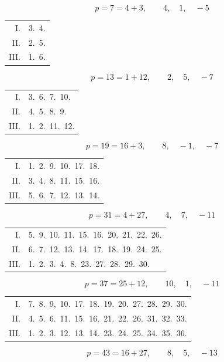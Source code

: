 \clearpage{}
\begin{center}\end{center}


\begingroup\small
\[p = 7 = 4+3, \qquad 4,\quad 1,\quad -5\]
\begin{center}\begin{tabular}{@{}rl@{}}
I. & 3.\ 4.\\
II. & 2.\ 5.\\
III. & 1.\ 6.\end{tabular}\end{center}
\[p = 13 = 1+12, \qquad 2,\quad 5,\quad -7\]
\begin{center}\begin{tabular}{@{}rl@{}}
I. & 3.\ 6.\ 7.\ 10.\\
II. & 4.\ 5.\ 8.\ 9.\\
III. & 1.\ 2.\ 11.\ 12.\end{tabular}\end{center}
\[p = 19 = 16+3, \qquad 8,\quad -1,\quad -7\]
\begin{center}\begin{tabular}{@{}rl@{}}
I. & 1.\ 2.\ 9.\ 10.\ 17.\ 18.\\
II. & 3.\ 4.\ 8.\ 11.\ 15.\ 16.\\
III. & 5.\ 6.\ 7.\ 12.\ 13.\ 14.\end{tabular}\end{center}
\[p = 31 = 4+27, \qquad 4,\quad 7,\quad -11\]
\begin{center}\begin{tabular}{@{}rl@{}}
I. & 5.\ 9.\ 10.\ 11.\ 15.\ 16.\ 20.\ 21.\ 22.\ 26.\\
II. & 6.\ 7.\ 12.\ 13.\ 14.\ 17.\ 18.\ 19.\ 24.\ 25.\\
III. & 1.\ 2.\ 3.\ 4.\ 8.\ 23.\ 27.\ 28.\ 29.\ 30.\end{tabular}\end{center}
\[p = 37 = 25+12, \qquad 10,\quad 1,\quad -11\]
\begin{center}\begin{tabular}{@{}rl@{}}
I. & 7.\ 8.\ 9,\ 10.\ 17.\ 18.\ 19.\ 20.\ 27.\ 28.\ 29.\ 30.\\
II. & 4.\ 5.\ 6.\ 11.\ 15.\ 16.\ 21.\ 22.\ 26.\ 31.\ 32.\ 33.\\
III. & 1.\ 2.\ 3.\ 12.\ 13.\ 14.\ 23.\ 24.\ 25.\ 34.\ 35.\ 36.\end{tabular}\end{center}
\[p = 43 = 16+27, \qquad 8,\quad 5,\quad -13\]
